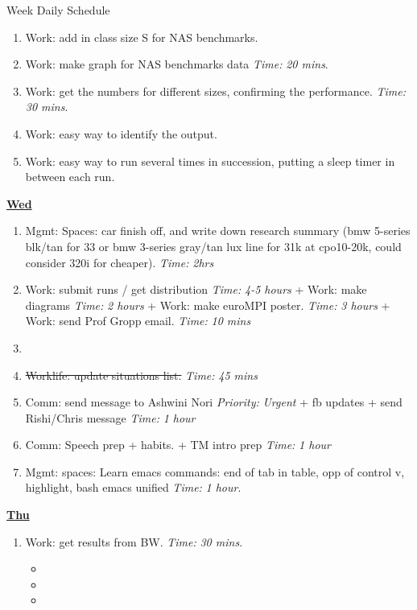 \documentclass[serif, mathserif, final]{beamer}
\newcommand{\doneTask}[1]{\item \sout{#1}}
\newcommand{\timeEst}[1]{\textit{Time:} \textit{#1}}
\newcommand{\priority}[1]{\textit{Priority:} \textit{#1}}
\begin{document}
\begin{frame}{}
\begin{columns}
\begin{column}{0.50\linewidth}
\begin{block}{Week Daily Schedule}
\begin{enumerate}
\item \tiny Work: add in class size S for NAS benchmarks. 
\item \tiny Work: make graph for NAS benchmarks data \timeEst{20 mins}. 

\item \tiny Work: get the numbers for different sizes, confirming the performance. \timeEst{30 mins}.  
\item \tiny Work: easy way to identify the output. 
\item \tiny Work: easy way to run several times in succession, putting a sleep timer in between each run. 
\end{enumerate} 

\textbf{\small {\underline{Wed}}}
\begin{enumerate} 

\tiny \item \tiny Mgmt: Spaces: car finish off, and write down research summary (bmw 5-series blk/tan for 33  or bmw 3-series gray/tan lux line for 31k at cpo10-20k, could consider 320i for cheaper). \timeEst{ 2hrs} 

\item \tiny Work: submit runs / get distribution \timeEst{4-5 hours}  + Work: make diagrams \timeEst{2 hours}   + Work: make euroMPI poster. \timeEst{3 hours} + Work: send Prof Gropp email. \timeEst{10 mins} 

\item \tiny \doneTask{ Worklife: update situations list.} \timeEst{45 mins}

\tiny \item \tiny Comm: send message to Ashwini Nori \priority{Urgent}  + fb updates + send Rishi/Chris message  \timeEst{1 hour} 
\tiny \item \tiny Comm: Speech prep + habits. + TM intro prep \timeEst{1 hour}

\item \tiny Mgmt: spaces: Learn emacs commands:  end of tab in table, opp of control v, highlight, bash emacs unified  \timeEst{1 hour}. 
\end{enumerate} 

\textbf{\small{\underline{Thu}}}
\begin{enumerate} 

\item \tiny Work: get results from BW. \timeEst{30 mins}. 
\begin{itemize}
\item \tiny 
\item \tiny 
\item \tiny 
\end{itemize} 


\end{enumerate}
\end{block}
\end{column}
\end{columns}
\end{frame}
\end{document}

